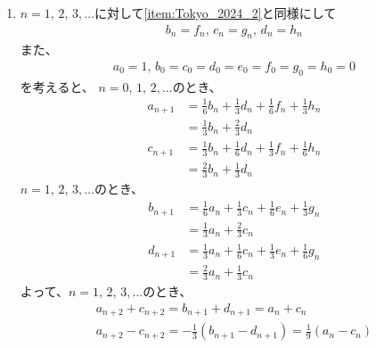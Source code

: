 \documentclass[a4paper]{ltjsarticle}
\begin{document}
\begin{ans*}
\begin{enumerate}[label=(\arabic*), ref=(\arabic*), itemsep=0pt]
    \item $n = 1,\,2,\,3,\dots$に対して\ref*{item:Tokyo_2024_2}と同様にして
    \begin{gather*}
      b_{n} = f_{n},\,c_{n} = g_{n},\,d_{n} = h_{n}
    \end{gather*}
    また、
    \begin{gather*}
      a_{0} = 1,\,b_{0} = c_{0} = d_{0} = e_{0} = f_{0} = g_{0} = h_{0} = 0
    \end{gather*}
    を考えると、
    $n=0,\,1,\,2,\dots$のとき、
    \begin{align*}
      a_{n+1}
      &= \frac{1}{6}b_{n} + \frac{1}{3}d_{n} + \frac{1}{6}f_{n} + \frac{1}{3}h_{n} \\
      &= \frac{1}{3}b_{n} + \frac{2}{3}d_{n} \\
      c_{n+1}
      &= \frac{1}{3}b_{n} + \frac{1}{6}d_{n} + \frac{1}{3}f_{n} + \frac{1}{6}h_{n} \\
      &= \frac{2}{3}b_{n} + \frac{1}{3}d_{n}
    \end{align*}
    $n=1,\,2,\,3,\dots$のとき、
    \begin{align*}
      b_{n+1}
      &= \frac{1}{6}a_{n} + \frac{1}{3}c_{n} + \frac{1}{6}e_{n} + \frac{1}{3}g_{n} \\
      &= \frac{1}{3}a_{n} + \frac{2}{3}c_{n} \\
      d_{n+1}
      &= \frac{1}{3}a_{n} + \frac{1}{6}c_{n} + \frac{1}{3}e_{n} + \frac{1}{6}g_{n} \\
      &= \frac{2}{3}a_{n} + \frac{1}{3}c_{n}
    \end{align*}
    よって、$n=1,\,2,\,3,\dots$のとき、
    \begin{gather*}
      a_{n+2} + c_{n+2} = b_{n+1} + d_{n+1} = a_{n} + c_{n} \\
      a_{n+2} - c_{n+2} = -\frac{1}{3}(b_{n+1} - d_{n+1}) = \frac{1}{9}(a_{n} - c_{n})
    \end{gather*}


\end{enumerate}
\end{ans*}
\end{document}

